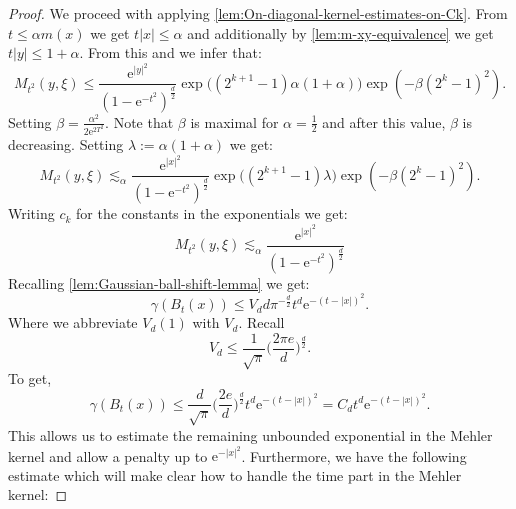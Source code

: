 \documentclass[a4paper,oneside,10pt]{amsproc}
\theoremstyle{remark}
\renewcommand{\leq}{\leqslant}
\renewcommand{\leq}{\leqslant}
\newcommand{\e}{\mathrm{e}} %
\renewcommand{\leq}{\leqslant}%
\begin{document}
\begin{proof}
  We proceed with applying
  \autoref{lem:On-diagonal-kernel-estimates-on-Ck}. From $t \leq
  \alpha m(x)$ we get $t |x| \leq \alpha$ and additionally by
  \autoref{lem:m-xy-equivalence} we get $t |y| \leq 1 + \alpha$.
  From this and  we infer that:
  \begin{equation}
    \label{eq:Mehler-kernel-estimate-one-sided-bound-1}
    M_{t^2}(y, \xi) \leq  \frac{\e^{|y|^2}}{(1 -
      \e^{-{t^2}})^{\frac{d}2}} \exp\bigl((2^{k + 1} - 1) \alpha (1 + \alpha) \bigr)
    \exp(- \beta (2^k - 1)^2 ).
  \end{equation}
  Setting $\beta = \frac{\alpha^2}{2 \e^{2T^2}}$. Note that $\beta$
  is maximal for $\alpha = \frac12$ and after this value, $\beta$ is decreasing.
  Setting $\lambda := \alpha(1 + \alpha)$ we get:
  \begin{equation}
    \label{eq:Mehler-kernel-estimate-one-sided-bound-2}
    M_{t^2}(y, \xi) \lesssim_\alpha  \frac{\e^{|x|^2}}{(1 -
      \e^{-{t^2}})^{\frac{d}2}} \exp\bigl((2^{k + 1} - 1) \lambda \bigr)
    \exp(- \beta (2^k - 1)^2 ).
  \end{equation}
  Writing $c_k$ for the constants in the exponentials we get:
  \begin{equation}
    \label{eq:Mehler-kernel-estimate-one-sided-bound-2}
    M_{t^2}(y, \xi) \lesssim_\alpha  \frac{\e^{|x|^2}}{(1 -
      \e^{-{t^2}})^{\frac{d}2}}
  \end{equation}
  Recalling \autoref{lem:Gaussian-ball-shift-lemma} we get:
  \begin{equation}
    \label{eq:Gaussian-ball-Maximal-function-cone-proof-1}
    \gamma(B_t(x)) \leq V_d d \pi^{-\frac{d}2} t^d \e^{-(t - |x|)^2} .
  \end{equation}
  Where we abbreviate $V_d(1)$ with $V_d$.
  Recall
  \begin{equation*}
    V_d \leq \frac1{\sqrt{\pi}} \biggl(\frac{2\pi e}{d}
    \biggr)^{\frac{d}{2}}.
  \end{equation*}
  To get,
  \begin{equation}
    \label{eq:Gaussian-ball-Maximal-function-cone-proof-2}
    \gamma(B_t(x)) \leq \frac{d}{\sqrt{\pi}} \biggl(\frac{2 e}{d}
    \biggr)^{\frac{d}{2}} t^d \e^{-(t - |x|)^2} = C_d t^d \e^{-(t - |x|)^2}.
  \end{equation}
  This allows us to estimate the remaining unbounded exponential in the
  Mehler kernel and allow a penalty up to $\e^{-|x|^2}$. Furthermore,
  we have the following estimate which will make clear how to handle the
  time part in the Mehler kernel:

\end{proof}
\end{document}
